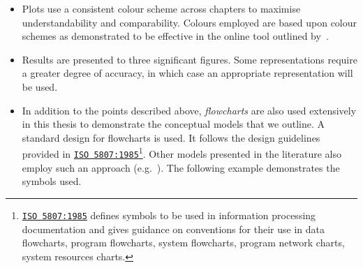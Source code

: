 \begin{preamble}
\begin{itemize}
    \item{Plots use a consistent colour scheme across chapters to maximise understandability and comparability. Colours employed are based upon colour schemes as demonstrated to be effective in the online tool outlined by~\cite{harrower2003colorbrewer}.}
    
    \item{Results are presented to three significant figures. Some representations require a greater degree of accuracy, in which case an appropriate representation will be used.}
    
    \item{In addition to the points described above, \emph{flowcharts} are also used extensively in this thesis to demonstrate the conceptual models that we outline. A standard design for flowcharts is used. It follows the design guidelines provided in \href{https://www.iso.org/standard/11955.html}{\texttt{ISO 5807:1985}}\footnote{\href{https://www.iso.org/standard/11955.html}{\texttt{ISO 5807:1985}} defines symbols to be used in information processing documentation and gives guidance on conventions for their use in data flowcharts, program flowcharts, system flowcharts, program network charts, system resources charts.}. Other models presented in the literature also employ such an approach (e.g.~\cite{thomas2014modelling_behaviour}). The following example demonstrates the symbols used.

\begin{figure}[h!]
    \centering
    \hspace*{9mm}
\end{figure}

}
\end{itemize}
\end{preamble}
